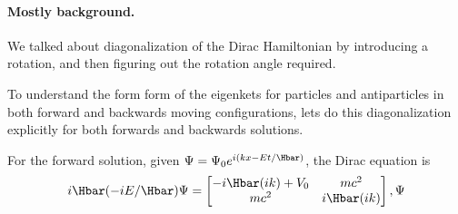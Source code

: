 %
%

\paragraph{Mostly background.}

We talked about diagonalization of the Dirac Hamiltonian by introducing a rotation, and then figuring out the rotation angle required.

To understand the form form of the eigenkets for particles and antiparticles in both forward and backwards moving configurations, lets do this diagonalization explicitly for both forwards and backwards solutions.

For the forward solution, given \( \Psi = \Psi_0 e^{i(k x - E t/\Hbar) } \), the Dirac equation is
%
\begin{dmath}\label{eqn:gradQuantumProblemSet4Problem3:20}
i \Hbar (-i E/\Hbar) \Psi =
\begin{bmatrix}
-i \Hbar (i k) + V_0 & m c^2 \\
m c^2 & i \Hbar (i k)
\end{bmatrix},
\Psi
\end{dmath}

